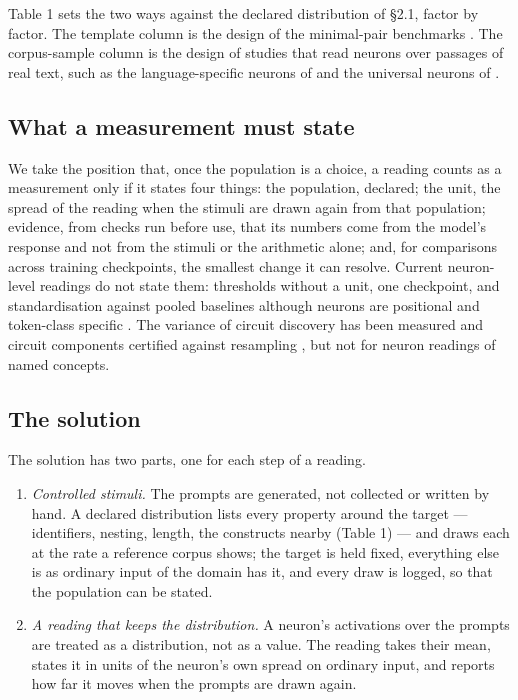 \documentclass{article}
\begin{document}
Table 1 sets the two ways against the declared distribution of \S2.1, factor by factor. The template column is the design of the minimal-pair benchmarks \citep{warstadt2020,gauthier2020}. The corpus-sample column is the design of studies that read neurons over passages of real text, such as the language-specific neurons of \citet{tang2024} and the universal neurons of \citet{gurnee2024}.

\subsection{What a measurement must state}

We take the position that, once the population is a choice, a reading counts as a measurement only if it states four things: the population, declared; the unit, the spread of the reading when the stimuli are drawn again from that population; evidence, from checks run before use, that its numbers come from the model's response and not from the stimuli or the arithmetic alone; and, for comparisons across training checkpoints, the smallest change it can resolve. Current neuron-level readings do not state them: thresholds without a unit, one checkpoint, and standardisation against pooled baselines although neurons are positional and token-class specific \citep{voita2024}. The variance of circuit discovery has been measured \citep{meloux2025,wu2026} and circuit components certified against resampling \citep{anani2026}, but not for neuron readings of named concepts.

\subsection{The solution}

The solution has two parts, one for each step of a reading.

\begin{enumerate}[topsep=2pt,itemsep=1pt,parsep=0pt,partopsep=0pt,leftmargin=*]
\item \emph{Controlled stimuli.} The prompts are generated, not collected or written by hand. A declared distribution lists every property around the target --- identifiers, nesting, length, the constructs nearby (Table 1) --- and draws each at the rate a reference corpus shows; the target is held fixed, everything else is as ordinary input of the domain has it, and every draw is logged, so that the population can be stated.
\item \emph{A reading that keeps the distribution.} A neuron's activations over the prompts are treated as a distribution, not as a value. The reading takes their mean, states it in units of the neuron's own spread on ordinary input, and reports how far it moves when the prompts are drawn again.
\end{enumerate}
\end{document}
